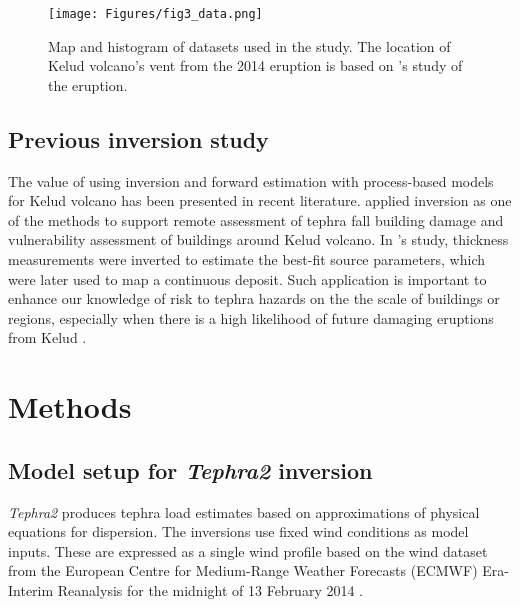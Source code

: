     \begin{figure}[htbp]
    \centering
    \texttt{[image: Figures/fig3\_data.png]}
    \caption{Map and histogram of datasets used in the study. The location of Kelud volcano's vent from the 2014 eruption is based on \cite{goode2019insights}'s study of the eruption.}
    \label{fig:datasets}
    \end{figure}

\subsection{Previous inversion study}

The value of using inversion and forward estimation with process-based models for Kelud volcano has been presented in recent literature. \cite{williams2020} applied inversion as one of the methods to support remote assessment of tephra fall building damage and vulnerability assessment of buildings around Kelud volcano. In \cite{williams2020}'s study, thickness measurements were inverted to estimate the best-fit source parameters, which were later used to map a continuous deposit. Such application is important to enhance our knowledge of risk to tephra hazards on the the scale of buildings or regions, especially when there is a high likelihood of future damaging eruptions from Kelud \citep{MAENO201924}.


\section{Methods}\label{section-methods}

\subsection{Model setup for \textit{Tephra2} inversion}\label{subsection-met-setup}

\textit{Tephra2} produces tephra load estimates based on approximations of physical equations for dispersion. The inversions use fixed wind conditions as model inputs. These are expressed as a single wind profile based on the wind dataset from the European Centre for Medium-Range Weather Forecasts (ECMWF) Era-Interim Reanalysis for the midnight of 13 February 2014 \citep{dee2011era}. 

